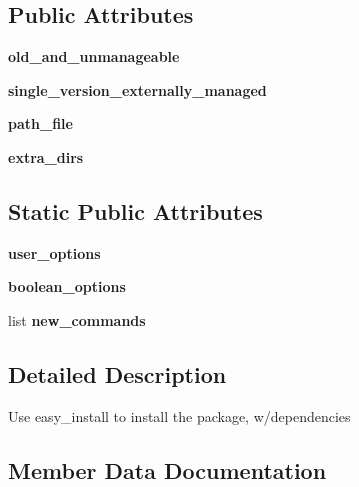 \subsection*{Public Attributes}
\begin{DoxyCompactItemize}
\item 
\mbox{\label{classsetuptools_1_1command_1_1install_1_1install_ad632056e38380043f49eaf7eabbe08a5}} 
{\bfseries old\+\_\+and\+\_\+unmanageable}
\item 
\mbox{\label{classsetuptools_1_1command_1_1install_1_1install_a7a20443140985362c236e68aca2f8f55}} 
{\bfseries single\+\_\+version\+\_\+externally\+\_\+managed}
\item 
\mbox{\label{classsetuptools_1_1command_1_1install_1_1install_a511be215285c366911de400d05cbecb8}} 
{\bfseries path\+\_\+file}
\item 
\mbox{\label{classsetuptools_1_1command_1_1install_1_1install_a5cc3711524f10b2e6c261bd50a975ef4}} 
{\bfseries extra\+\_\+dirs}
\end{DoxyCompactItemize}
\subsection*{Static Public Attributes}
\begin{DoxyCompactItemize}
\item 
{\bfseries user\+\_\+options}
\item 
{\bfseries boolean\+\_\+options}
\item 
list {\bfseries new\+\_\+commands}
\end{DoxyCompactItemize}


\subsection{Detailed Description}
\begin{DoxyVerb}Use easy_install to install the package, w/dependencies\end{DoxyVerb}
 

\subsection{Member Data Documentation}
\mbox{\label{classsetuptools_1_1command_1_1install_1_1install_a756b6cae4d9e0e49b62322c72d9b3708}} 

